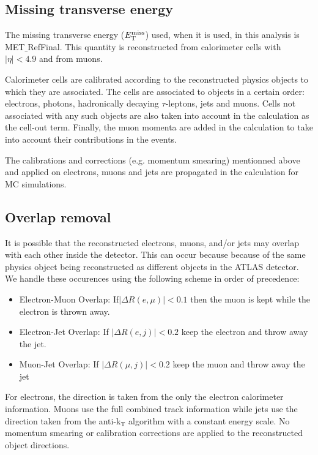 \subsection{Missing transverse energy}
The missing transverse energy ($E_{\mathrm{T}}^{\mathrm{miss}}$) used, when it is used, in this analysis is
MET$\_$RefFinal. This quantity is reconstructed from calorimeter cells with $|\eta|<4.9$ and from muons. 

Calorimeter cells are calibrated according to the reconstructed physics
objects to which they are associated. The cells are associated to
objects in a certain order: electrons, photons, hadronically decaying
$\tau$-leptons, jets and muons. Cells not associated with any such
objects are also taken into account in the \MET calculation as the cell-out term.
Finally, the muon momenta are added in the \MET{} calculation to take into account their contributions in the events.

The calibrations and corrections (e.g. momentum smearing) mentionned above and applied on electrons, muons and jets are propagated in the \MET{} calculation for MC simulations.


\subsection{Overlap removal}

It is possible that the reconstructed electrons, muons, and/or jets
may overlap with each other inside the detector.  This can occur
because because of the same physics object being reconstructed as different
objects in the ATLAS detector.  We handle these occurences using the following
scheme in order of precedence:
\begin{itemize}
	\item Electron-Muon Overlap: If$|\Delta R(e,\mu)| < 0.1$ then the  muon is kept while the electron is thrown away.
	\item Electron-Jet Overlap: If $|\Delta R(e,j)| < 0.2$ keep the electron and throw away the jet.
	\item Muon-Jet Overlap: If $|\Delta R(\mu,j)| < 0.2$ keep the muon and throw away the jet
\end{itemize}
For electrons, the direction is taken from the only the electron calorimeter
information.  Muons use the full combined track information while jets
use the direction taken from the anti-k$_{\mathrm{T}}$  algorithm with
a constant energy scale. No momentum smearing or calibration corrections
are applied to the reconstructed object directions. 

